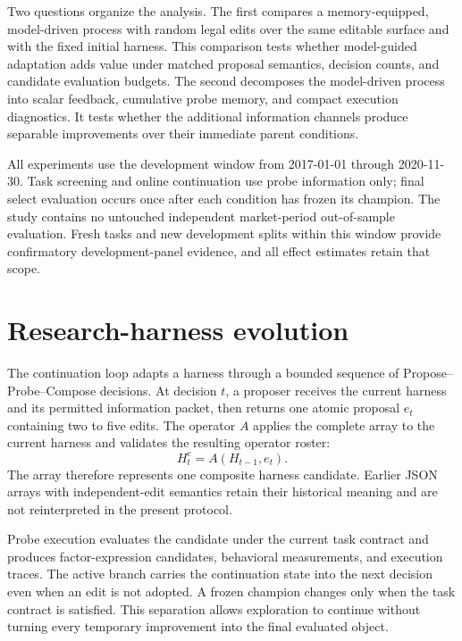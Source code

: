 Two questions organize the analysis. The first compares a memory-equipped, model-driven process with random legal edits over the same editable surface and with the fixed initial harness. This comparison tests whether model-guided adaptation adds value under matched proposal semantics, decision counts, and candidate evaluation budgets. The second decomposes the model-driven process into scalar feedback, cumulative probe memory, and compact execution diagnostics. It tests whether the additional information channels produce separable improvements over their immediate parent conditions.

All experiments use the development window from 2017-01-01 through 2020-11-30. Task screening and online continuation use probe information only; final select evaluation occurs once after each condition has frozen its champion. The study contains no untouched independent market-period out-of-sample evaluation. Fresh tasks and new development splits within this window provide confirmatory development-panel evidence, and all effect estimates retain that scope.

\section{Research-harness evolution}
\label{sec:harness}

The continuation loop adapts a harness through a bounded sequence of Propose--Probe--Compose decisions. At decision $t$, a proposer receives the current harness and its permitted information packet, then returns one atomic proposal $e_t$ containing two to five edits. The operator $A$ applies the complete array to the current harness and validates the resulting operator roster:
\begin{equation}
H_t^{c}=A(H_{t-1},e_t).
\label{eq:atomic}
\end{equation}
The array therefore represents one composite harness candidate. Earlier JSON arrays with independent-edit semantics retain their historical meaning and are not reinterpreted in the present protocol.

Probe execution evaluates the candidate under the current task contract and produces factor-expression candidates, behavioral measurements, and execution traces. The active branch carries the continuation state into the next decision even when an edit is not adopted. A frozen champion changes only when the task contract is satisfied. This separation allows exploration to continue without turning every temporary improvement into the final evaluated object.

